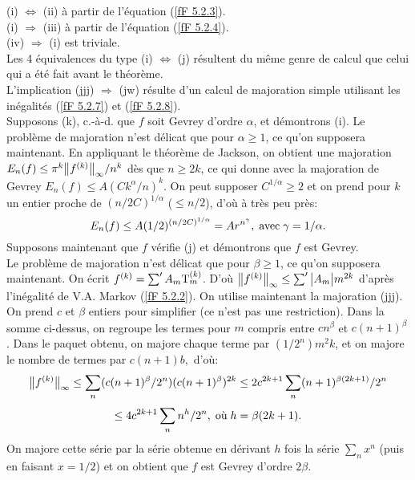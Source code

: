 \proof
(i) $\Leftrightarrow$ (ii)  à partir de l'équation (\ref{fF 5.2.3}). \\  
(i)  $\Rightarrow$ (iii) à partir de l'équation (\ref{fF 5.2.4}). \\ 
(iv)  $\Rightarrow$ (i)  est triviale.\\  
Les  4  équivalences du type (i) $\Leftrightarrow$ (j)  résultent du même 
genre de calcul que celui qui a été fait avant le théorème.\\
L'implication  (jjj) $\Rightarrow$ (jw)  résulte d'un calcul de majoration 
simple utilisant  les inégalités (\ref{fF 5.2.7}) et (\ref{fF 5.2.8}). \\
Supposons  (k), c.-à-d. que $f$ soit Gevrey d'ordre  $\alpha$, et démontrons 
(i). 
Le problème de majoration n'est délicat que pour  $\alpha \geq 1$,
 ce qu'on supposera maintenant. En appliquant le théorème de Jackson, on 
obtient une majoration  
$E_n(f) \leq \pi^{k} \big\lVert f^{(k)}  \big\rVert_{\infty} /n^k$
  dès que  $n \geq 2k$,  ce qui donne avec la majoration de Gevrey    
$E_n(f) \leq A(Ck^{\alpha}/n)^k$.  
On peut supposer  $C^{1/ \alpha} \geq 2$  et on prend pour  $k$  un entier 
proche de  $(n/2C)^{1/ \alpha}$ ($ \leq n/2$),
 d'où à très peu près:
$$E_n(f) \leq A(1/2)^{(n/2C)^{1/ \alpha}} = Ar^{n^{\gamma}}, \; \hbox{avec} \; 
\gamma = 1/ \alpha.$$
Supposons maintenant que $f$ vérifie (j)  et démontrons que $f$ est Gevrey.  \\
Le problème de majoration n'est délicat que pour  $\beta \geq 1$, ce qu'on 
supposera maintenant. On écrit  $f^{(k)} = \sum' A_m {\rm T}_m^{(k)}$.   
D'où   $\big\lVert f^{(k)}  \big\rVert_{\infty} \leq \sum' \big|{A_m}\big| m^{2k}$ d'après l'inégalité de V.A. Markov (\ref{fF 5.2.2}).  
On utilise maintenant la majoration  (jjj). On prend $c$ et $\beta$ 
entiers pour simplifier (ce n'est pas une restriction). Dans la somme ci-dessus, 
on regroupe les termes pour $ m $ compris entre $cn^{\beta}$ et 
$c(n+1)^{\beta}$. Dans le paquet obtenu, on majore chaque terme par $ (1/2^n) 
m^2k$, et on majore le nombre de termes par $ c(n+1)b,$ d'où:
\[
\big\lVert f^{(k)}  \big\rVert_\infty \leq \sum_n (c(n+1)^{\beta}/2^n)(c(n+1)^{\beta})^{2k} \leq 2c^{2k+1} \sum_n (n+1)^{\beta (2k+1)}/2^n
\]
\[
\leq 4c^{2k+1} \sum_n n^h/2^n, \; \hbox{où} \; h = \beta(2k+1).
\] 
On majore cette série par la série obtenue en dérivant $h$ fois  la 
série  $\sum_n x^n$  (puis en faisant  $x=1/2$)  et on obtient que $f$ est 
Gevrey d'ordre  $2\beta$.  \eop



